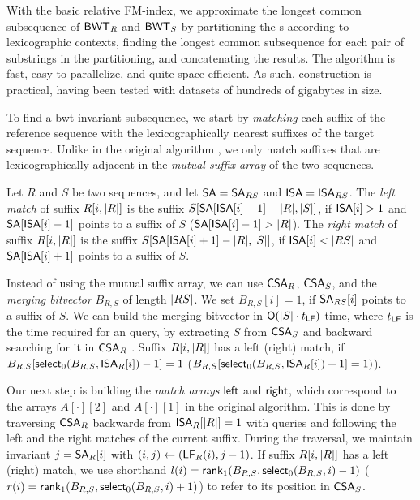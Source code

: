 With the basic relative FM-index, we approximate the longest common
subsequence of $\mathsf{BWT}_{R}$ and $\mathsf{BWT}_{S}$ by partitioning the \BWT{}s according
to lexicographic contexts, finding the longest common subsequence for each
pair of substrings in the partitioning, and concatenating the results. The
algorithm is fast, easy to parallelize, and quite space-efficient. As such,
\RFM{} construction is practical, having been tested with datasets of hundreds
of gigabytes in size.

To find a bwt-invariant subsequence, we start by \emph{matching} each suffix
of the reference sequence with the lexicographically nearest suffixes of the
target sequence. Unlike in the original algorithm \cite{Belazzougui2014}, we
only match suffixes that are lexicographically adjacent in the \emph{mutual
suffix array} of the two sequences.

\begin{definition}
Let $R$ and $S$ be two sequences, and let $\mathsf{SA} = \mathsf{SA}_{RS}$ and $\mathsf{ISA} =
\mathsf{ISA}_{RS}$. The \emph{left match} of suffix $R[i,\lvert R \rvert]$ is the suffix
$S[\mathsf{SA}[\mathsf{ISA}[i]-1] - \lvert R \rvert, \lvert S \rvert]$, if $\mathsf{ISA}[i] > 1$ and
$\mathsf{SA}[\mathsf{ISA}[i]-1]$ points to a suffix of $S$ ($\mathsf{SA}[\mathsf{ISA}[i]-1] > \lvert R \rvert$).
The \emph{right match} of suffix $R[i,\lvert R \rvert]$ is the suffix
$S[\mathsf{SA}[\mathsf{ISA}[i]+1] - \lvert R \rvert, \lvert S \rvert]$, if $\mathsf{ISA}[i] < \lvert RS \rvert$ and
$\mathsf{SA}[\mathsf{ISA}[i]+1]$ points to a suffix of $S$.
\end{definition}

Instead of using the mutual suffix array, we can use $\mathsf{CSA}_{R}$, $\mathsf{CSA}_{S}$,
and the \emph{merging bitvector} $B_{R,S}$ of length $\lvert RS \rvert$. We set
$B_{R,S}[i] = 1$, if $\mathsf{SA}_{RS}[i]$ points to a suffix of $S$. We can build the
merging bitvector in $\mathsf{O}(\lvert S \rvert \cdot t_{\mathsf{LF}})$ time, where $t_{\mathsf{LF}}$ is
the time required for an \LF{} query, by extracting $S$ from $\mathsf{CSA}_{S}$ and
backward searching for it in $\mathsf{CSA}_{R}$ \cite{Siren2009}. Suffix
$R[i,\lvert R \rvert]$ has a left (right) match, if $B_{R,S}[\mathsf{select}_{0}(B_{R,S},
\mathsf{ISA}_{R}[i])-1] = 1$ ($B_{R,S}[\mathsf{select}_{0}(B_{R,S}, \mathsf{ISA}_{R}[i])+1] = 1)$).

Our next step is building the \emph{match arrays} $\mathsf{left}$ and $\mathsf{right}$,
which correspond to the arrays $A[\cdot][2]$ and $A[\cdot][1]$ in the original
algorithm. This is done by traversing $\mathsf{CSA}_{R}$ backwards from
$\mathsf{ISA}_{R}[\lvert R \rvert] = 1$ with \LF{} queries and following the left and the
right matches of the current suffix. During the traversal, we maintain
invariant $j = \mathsf{SA}_{R}[i]$ with $(i,j) \leftarrow (\mathsf{LF}_{R}(i), j-1)$. If
suffix $R[i,\lvert R \rvert]$ has a left (right) match, we use shorthand $l(i) =
\mathsf{rank}_{1}(B_{R,S}, \mathsf{select}_{0}(B_{R,S}, i)-1)$ ($r(i) = \mathsf{rank}_{1}(B_{R,S},
\mathsf{select}_{0}(B_{R,S}, i)+1)$) to refer to its position in $\mathsf{CSA}_{S}$.

